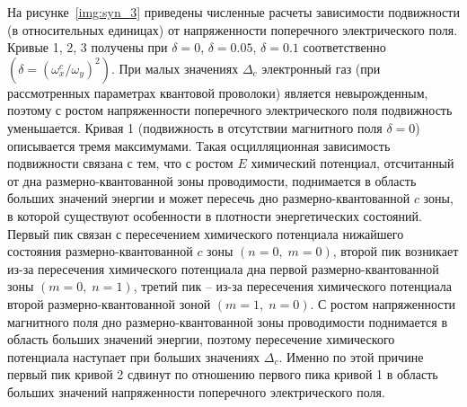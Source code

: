На рисунке~\ref{img:syn_3} приведены численные расчеты зависимости подвижности (в относительных единицах) от напряженности поперечного электрического поля. Кривые 1, 2, 3 получены при $\delta = 0$, $\delta = 0.05$, $\delta = 0.1$ соответственно $\left(\delta = {\left(\omega^c_x/\omega_y\right)}^2\right)$. При малых значениях $\Delta_c$ электронный газ (при рассмотренных параметрах квантовой проволоки) является невырожденным, поэтому с ростом напряженности поперечного электрического поля подвижность уменьшается. Кривая 1 (подвижность в отсутствии  магнитного поля $\delta = 0$) описывается тремя максимумами. Такая осцилляционная зависимость подвижности связана с тем, что с ростом $E$ химический потенциал, отсчитанный от дна размерно-квантованной зоны проводимости, поднимается в область больших значений энергии и может пересечь дно размерно-квантованной $c$ зоны, в которой существуют особенности в плотности энергетических состояний. Первый пик связан с пересечением химического потенциала нижайшего состояния размерно-квантованной $c$ зоны $(n=0,\; m=0)$, второй пик возникает из-за пересечения химического потенциала дна первой размерно-квантованной зоны $(m=0,\; n=1)$, третий пик -- из-за пересечения химического потенциала второй размерно-квантованной зоной $(m=1,\; n=0)$. С ростом напряженности магнитного поля дно размерно-квантованной зоны проводимости поднимается в область больших значений энергии, поэтому пересечение химического потенциала наступает при больших значениях $\Delta_c$. Именно по этой причине первый пик кривой 2 сдвинут по отношению первого пика кривой 1 в область больших значений напряженности поперечного электрического поля.



